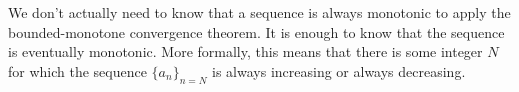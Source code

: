 \documentclass{ximera}
\begin{document}

\begin{remark}
We don't actually need to know that a sequence is always monotonic to apply
the bounded-monotone convergence theorem. It is enough to know that
the sequence is eventually monotonic.  More formally, this means that there is 
some integer $N$ for which the sequence $\{a_n\}_{n=N}$ 
is always increasing or always decreasing.
\end{remark}

%
%
\end{document}
